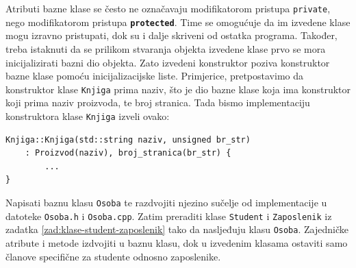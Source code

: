 Atributi bazne klase se često ne označavaju modifikatorom
pristupa \texttt{private},
nego modifikatorom pristupa \texttt{\textbf{protected}}.
Time se omogućuje da im izvedene klase mogu izravno pristupati, dok su i dalje skriveni od ostatka programa.
Također, treba istaknuti da se prilikom stvaranja objekta izvedene klase 
prvo se mora inicijalizirati bazni dio objekta. 
Zato izvedeni konstruktor poziva konstruktor bazne klase pomoću inicijalizacijske liste.
Primjerice, pretpostavimo da konstruktor klase \texttt{Knjiga}
prima naziv, što je dio bazne klase koja ima konstruktor koji prima naziv proizvoda, te broj stranica.
Tada bismo implementaciju konstruktora klase \texttt{Knjiga} izveli ovako:
\begin{verbatim}
Knjiga::Knjiga(std::string naziv, unsigned br_str)
    : Proizvod(naziv), broj_stranica(br_str) {
        ...
}
\end{verbatim}



\begin{zadatak}\label{zad:hijerarhija-osoba}
    Napisati baznu klasu \texttt{Osoba} te razdvojiti njezino sučelje od implementacije u datoteke \texttt{Osoba.h} i \texttt{Osoba.cpp}. Zatim preraditi klase \texttt{Student} i \texttt{Zaposlenik} iz zadatka \ref{zad:klase-student-zaposlenik} tako da nasljeđuju klasu \texttt{Osoba}. Zajedničke atribute i metode izdvojiti u baznu klasu, dok u izvedenim klasama ostaviti samo članove specifične za studente odnosno zaposlenike.
\end{zadatak}


